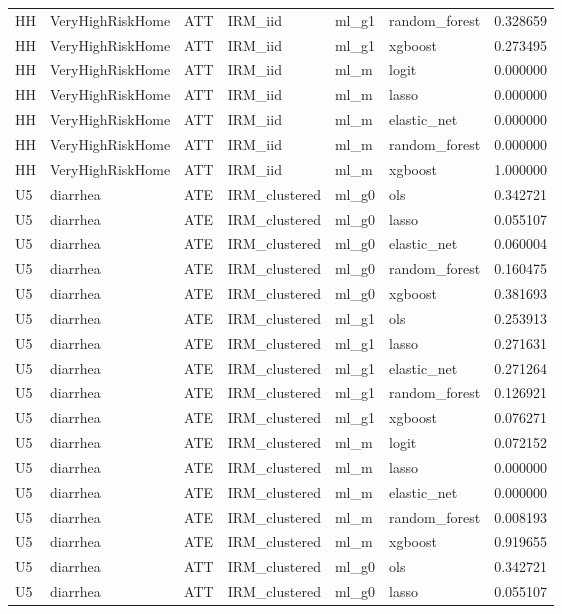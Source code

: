 \begin{longtable}{llllllr}
HH & VeryHighRiskHome & ATT & IRM\_iid & ml\_g1 & random\_forest & 0.328659 \\
HH & VeryHighRiskHome & ATT & IRM\_iid & ml\_g1 & xgboost & 0.273495 \\
HH & VeryHighRiskHome & ATT & IRM\_iid & ml\_m & logit & 0.000000 \\
HH & VeryHighRiskHome & ATT & IRM\_iid & ml\_m & lasso & 0.000000 \\
HH & VeryHighRiskHome & ATT & IRM\_iid & ml\_m & elastic\_net & 0.000000 \\
HH & VeryHighRiskHome & ATT & IRM\_iid & ml\_m & random\_forest & 0.000000 \\
HH & VeryHighRiskHome & ATT & IRM\_iid & ml\_m & xgboost & 1.000000 \\
U5 & diarrhea & ATE & IRM\_clustered & ml\_g0 & ols & 0.342721 \\
U5 & diarrhea & ATE & IRM\_clustered & ml\_g0 & lasso & 0.055107 \\
U5 & diarrhea & ATE & IRM\_clustered & ml\_g0 & elastic\_net & 0.060004 \\
U5 & diarrhea & ATE & IRM\_clustered & ml\_g0 & random\_forest & 0.160475 \\
U5 & diarrhea & ATE & IRM\_clustered & ml\_g0 & xgboost & 0.381693 \\
U5 & diarrhea & ATE & IRM\_clustered & ml\_g1 & ols & 0.253913 \\
U5 & diarrhea & ATE & IRM\_clustered & ml\_g1 & lasso & 0.271631 \\
U5 & diarrhea & ATE & IRM\_clustered & ml\_g1 & elastic\_net & 0.271264 \\
U5 & diarrhea & ATE & IRM\_clustered & ml\_g1 & random\_forest & 0.126921 \\
U5 & diarrhea & ATE & IRM\_clustered & ml\_g1 & xgboost & 0.076271 \\
U5 & diarrhea & ATE & IRM\_clustered & ml\_m & logit & 0.072152 \\
U5 & diarrhea & ATE & IRM\_clustered & ml\_m & lasso & 0.000000 \\
U5 & diarrhea & ATE & IRM\_clustered & ml\_m & elastic\_net & 0.000000 \\
U5 & diarrhea & ATE & IRM\_clustered & ml\_m & random\_forest & 0.008193 \\
U5 & diarrhea & ATE & IRM\_clustered & ml\_m & xgboost & 0.919655 \\
U5 & diarrhea & ATT & IRM\_clustered & ml\_g0 & ols & 0.342721 \\
U5 & diarrhea & ATT & IRM\_clustered & ml\_g0 & lasso & 0.055107 \\

\end{longtable}
